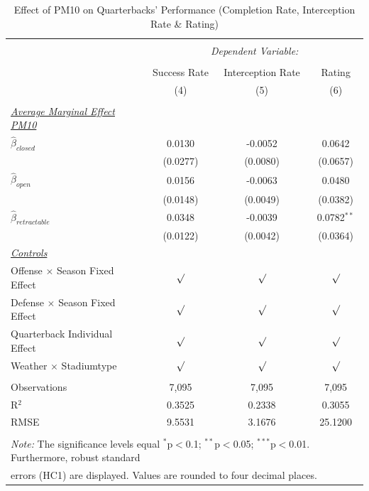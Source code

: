 \documentclass[12pt,a4paper]{article}
\begin{document}
{\begin{table}[!htbp]
\begin{tabular}{@{\extracolsep{5pt}}lccc}
  \end{tabular}
\end{table} 
\clearpage
\begin{table}[!htbp] \centering 
  \caption{Effect of PM10 on Quarterbacks' Performance (Completion Rate, Interception Rate \& Rating)} 
  \label{T1} 
\begin{tabular}{@{\extracolsep{5pt}}lccc} 
\\[-1.8ex]\hline 
\hline \\[-1.8ex] 
 & \multicolumn{3}{c}{\textit{Dependent Variable:}} \\ \cline{2-4} \\ [-1.8ex]
 & Success Rate & Interception Rate & Rating \\ 
  & (4) & (5) & (6)\\ \hline \\[-1.8ex] 
 \underline{\textit{Average Marginal Effect PM10}}\\[0.4cm]
  $\hat{\beta}_{closed}$& 0.0130 & -0.0052 & 0.0642 \\ 
  & (0.0277)  & (0.0080)& (0.0657) \\[0.4cm]
  $\hat{\beta}_{open}$&  0.0156 & -0.0063 & 0.0480\\ 
  & (0.0148) & (0.0049) & (0.0382) \\[0.4cm]
  $\hat{\beta}_{retractable}$& 0.0348 & -0.0039 & 0.0782$^{**}$\\ 
  & (0.0122) & (0.0042) & (0.0364)\\ [0.4cm]
  \underline{\textit{Controls}} \\[0.4cm]
  Offense $\times$ Season Fixed Effect & $\surd$ & $\surd$ & $\surd$ \\[0.4cm]
   Defense $\times$ Season Fixed Effect & $\surd$ & $\surd$  & $\surd$ \\[0.4cm]
    Quarterback Individual Effect & $\surd$ & $\surd$ & $\surd$  \\[0.4cm]
    Weather $\times $ Stadiumtype & $\surd$ & $\surd$ & $\surd$ \\
\hline \\[-1.8ex] 
Observations & 7,095 & 7,095 & 7,095 \\ 
R$^{2}$ & 0.3525 & 0.2338   &  0.3055 \\ 
RMSE & 9.5531 & 3.1676  & 25.1200 \\ \hline 
\hline \\[-1.8ex] 
\multicolumn{4}{l}{\footnotesize \textit{Note:} The significance levels equal {$^{*}$p$<$0.1; $^{**}$p$<$0.05; $^{***}$p$<$0.01}.  Furthermore, robust  standard} \\ \multicolumn{4}{l}{\footnotesize errors (HC1) are displayed. Values are rounded to four decimal places.}
  \end{tabular}
\end{table} 
}
\end{document}
